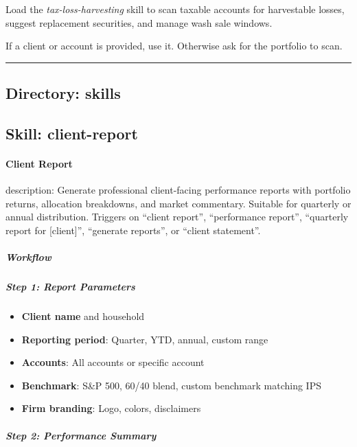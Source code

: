 \documentclass[11pt]{article}
\begin{document}
Load the \emph{tax-loss-harvesting} skill to scan taxable accounts for harvestable losses, suggest replacement securities, and manage wash sale windows.


If a client or account is provided, use it. Otherwise ask for the portfolio to scan.


\vspace{0.8em}\hrule\vspace{0.8em}

\subsection{Directory: skills}

\subsection{Skill: client-report}\label{file:skills-client-report-SKILL.md}

\paragraph{Client Report}\mbox{}\par

description: Generate professional client-facing performance reports with portfolio returns, allocation breakdowns, and market commentary. Suitable for quarterly or annual distribution. Triggers on ``client report'', ``performance report'', ``quarterly report for [client]'', ``generate reports'', or ``client statement''.


\subparagraph{Workflow}\mbox{}\par

\subparagraph{Step 1: Report Parameters}\mbox{}\par

\begin{itemize}[leftmargin=*,itemsep=2pt,topsep=2pt]
\item {} \textbf{Client name} and household
\item {} \textbf{Reporting period}: Quarter, YTD, annual, custom range
\item {} \textbf{Accounts}: All accounts or specific account
\item {} \textbf{Benchmark}: S\&P 500, 60/40 blend, custom benchmark matching IPS
\item {} \textbf{Firm branding}: Logo, colors, disclaimers
\end{itemize}

\subparagraph{Step 2: Performance Summary}\mbox{}\par
\end{document}

